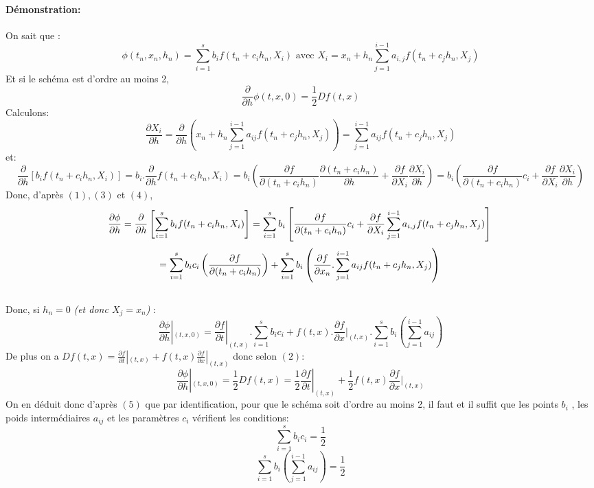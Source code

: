 \documentclass[a4paper,12pt,landscape]{article}
\begin{document}
\paragraph{Démonstration:} On sait que : 
\begin{equation}\phi(t_n,x_n,h_n)=\sum_{i=1}^{s} b_i f(t_n+c_i h_n,X_i) \textrm{ avec } X_i=x_n+h_n\sum^{i-1}_{j=1} a_{i,j} f(t_n+c_jh_n,X_j)
\end{equation}
Et si le schéma est d'ordre au moins 2, 
\begin{equation}\frac{\partial}{\partial h}\phi(t,x,0)=\frac{1}{2}Df(t,x)
\end{equation}
Calculons:
\begin{equation}\frac{\partial X_i}{\partial h}=\frac{\partial}{\partial h}(x_n+h_n\sum^{i-1}_{j=1} a_{ij} f(t_n+c_jh_n,X_j))=\sum^{i-1}_{j=1} a_{ij} f(t_n+c_jh_n,X_j)
\end{equation}
et:
\begin{equation}
\frac{\partial}{\partial h}\left[ b_if(t_n+c_ih_n,X_i)\right] = b_i . \frac{\partial}{\partial h}f(t_n+c_ih_n,X_i)= b_i \left( \frac{\partial f}{\partial (t_n+c_ih_n)}\frac{\partial (t_n+c_ih_n)}{\partial h}+\frac{\partial f}{\partial X_i}\frac{\partial X_i}{\partial h}\right)= b_i \left( \frac{\partial f}{\partial (t_n+c_ih_n)}c_i+\frac{\partial f}{\partial X_i}\frac{\partial X_i}{\partial h}\right)
\end{equation}
Donc, d'après $(1), (3)$ et $(4)$,
$$ \frac{\partial \phi}{\partial h} = \frac{\partial}{\partial h}\left[ \sum^{s}_{i=1} b_i f(t_n+c_i h_n,X_i)\right] = \sum^{s}_{i=1} b_i\left[ \frac{\partial f}{\partial (t_n+c_ih_n)}c_i+\frac{\partial f}{\partial X_i}\sum^{i-1}_{j=1} a_{i,j} f(t_n+c_jh_n,X_j) \right]\\ $$
$$= \sum^{s}_{i=1} b_ic_i\left( \frac{\partial f}{\partial (t_n+c_ih_n)}\right) +\sum^{s}_{i=1} b_i \left( \frac{\partial f}{\partial x_n}.\sum^{i-1}_{j=1} a_{ij} f(t_n+c_jh_n,X_j) \right)\\ $$
\\
Donc, si $h_n=0$ \textit{(et donc $X_j=x_n$)} :
\begin{equation}
\frac{\partial \phi}{\partial h}|_{(t,x,0)} = \frac{\partial f}{\partial t}|_{(t,x)}.\sum^{s}_{i=1} b_ic_i +  f(t,x).\frac{\partial f}{\partial x}|_{(t,x)}.\sum^{s}_{i=1} b_i\left(\sum^{i-1}_{j=1} a_{ij}\right)
\end{equation}
De plus on a $Df(t,x)=\frac{\partial f}{\partial t}|_{(t,x)}+f(t,x)\frac{\partial f}{\partial x}|_{(t,x)}$ donc selon $(2)$:
$$\frac{\partial \phi}{\partial h}|_{(t,x,0)}=\frac{1}{2}Df(t,x)= \frac{1}{2}\frac{\partial f}{\partial t}|_{(t,x)}+\frac{1}{2}f(t,x) \frac{\partial f}{\partial x}|_{(t,x)}$$
On en déduit donc d'après $(5)$ que par identification, pour que le schéma soit d'ordre au moins 2, il faut et
il suffit que les points $b_i$ , les poids intermédiaires $a_{ij}$ et les paramètres $c_i$
vérifient les conditions: 
$$\sum^{s}_{i=1} b_ic_i = \frac{1}{2}$$
$$\sum^{s}_{i=1} b_i \left(\sum^{i-1}_{j=1} a_{ij}\right) = \frac{1}{2}$$
\end{document}
